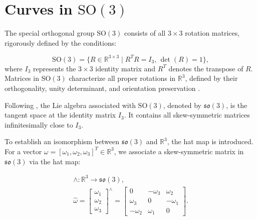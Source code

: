 \section{Curves in \texorpdfstring{\(\mathrm{SO}(3)\)}{(3)}}
\label{chap:Curves-in-SO3}

The special orthogonal group \(\mathrm{SO}(3)\) consists of all \(3 \times 3\) rotation matrices, rigorously defined by the conditions:

\begin{equation}
    \mathrm{SO}(3) = \{ R \in \mathbb{R}^{3 \times 3} \mid R^T R = I_3, \, \det(R) = 1 \},
    \label{eq:SO3}
\end{equation}
where \(I_3\) represents the \(3 \times 3\) identity matrix and \(R^T\) denotes the transpose of \(R\). Matrices in \(\mathrm{SO}(3)\) characterize all proper rotations in \(\mathbb{R}^3\), defined by their orthogonality, unity determinant, and orientation preservation \cite{hallLieGroupsLie2015}.

Following \cite{gallegoCompactFormulaDerivative2015,celledoniLieGroupIntegrators2022}, the Lie algebra associated with \(\mathrm{SO}(3)\), denoted by \(\mathfrak{so}(3)\), is the tangent space at the identity matrix \(I_3\). It contains all skew-symmetric matrices infinitesimally close to \(I_3\).


To establish an isomorphism between \(\mathfrak{so}(3)\) and \(\mathbb{R}^3\), the hat map is introduced. For a vector \(\omega = [\omega_1, \omega_2, \omega_3]^T \in \mathbb{R}^3\), we associate a skew-symmetric matrix in \(\mathfrak{so}(3)\) via the hat map:

\begin{equation}
    \begin{aligned}
        \wedge : \mathbb{R}^3 \rightarrow \mathfrak{so}(3), \\
        \hat{\omega} = \begin{bmatrix} \omega_1 \\ \omega_2 \\ \omega_3 \end{bmatrix}^\wedge
        =
        \begin{bmatrix} 0 & -\omega_3 & \omega_2 \\ \omega_3 & 0 & -\omega_1 \\ -\omega_2 & \omega_1 & 0 \end{bmatrix}. 
    \end{aligned}
    \label{eq:hat_SO3}
\end{equation}

